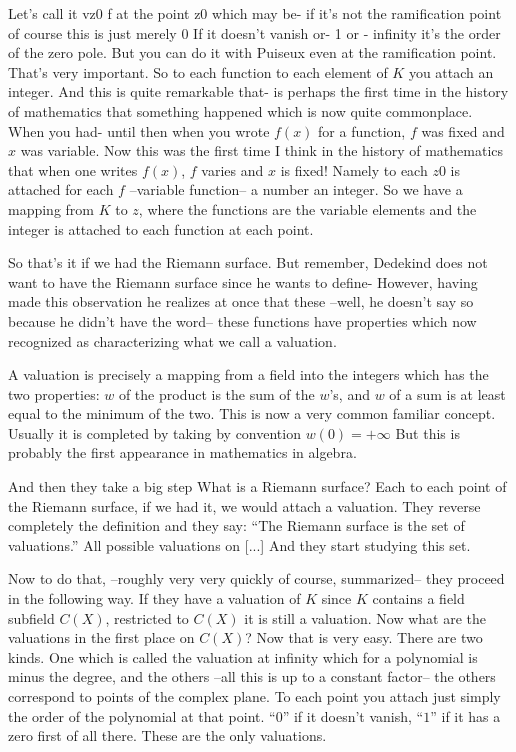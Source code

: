 \documentclass{article}
\begin{document}
Let's call it vz0 f at the point z0 which may be- 
if it's not the ramification point of course this is just merely 0
If it doesn't vanish or- 1 or - infinity it's the order of the zero pole.
But you can do it with Puiseux 
even at the ramification point. 
That's very important.
So to each function to each element of $K$ you attach an integer.
And this is quite remarkable that- 
is perhaps the first time in the history of mathematics
that something happened which is now quite commonplace.
When you had- until then when you wrote $f(x)$ for a function, $f$ was fixed and $x$ was variable.
Now this was the first time I think 
in the history of mathematics 
that when one writes $f(x)$, $f$ varies and $x$ is fixed!
Namely to each $z0$ is attached 
for each $f$ --variable function-- a number an integer.
So we have a mapping from $K$ to $z$, 
where the functions are the variable elements 
and the integer is attached to each function at each point.

So that's it if we had the Riemann surface.
But remember, Dedekind does not want to have the Riemann surface 
since he wants to define-
However, having made this observation
he realizes at once that these 
--well, he doesn't say so because he didn't have the word--
these functions have properties 
which now recognized as characterizing what we call a valuation.

A valuation is precisely a mapping from a field 
into the integers which has the two properties:
$w$ of the product is the sum of the $w$'s, 
and $w$ of a sum is at least equal to the minimum of the two.
This is now a very common familiar concept.
Usually it is completed by taking by convention $w(0)=+\infty$
But this is probably the first appearance in mathematics in algebra.

And then they take a big step
What is a Riemann surface?
Each to each point of the Riemann surface,
if we had it,
we would attach a valuation.
They reverse completely the definition and they say:
``The Riemann surface is the set of valuations.''
All possible valuations on [...]
And they start studying this set.

Now to do that,
--roughly very very quickly of course, summarized--
they proceed in the following way.
If they have a valuation of $K$
since $K$ contains a field subfield $C(X)$,
restricted to $C(X)$ it is still a valuation.
Now what are the valuations in the first place on $C(X)$?
Now that is very easy.
There are two kinds.
One which is called the valuation at infinity
which for a polynomial is minus the degree,
and the others
--all this is up to a constant factor--
the others correspond to points of the complex plane.
To each point you attach just simply 
the order of the polynomial at that point.
``$0$'' if it doesn't vanish, ``$1$'' if it has a zero first of all there.
These are the only valuations.
\end{document}
